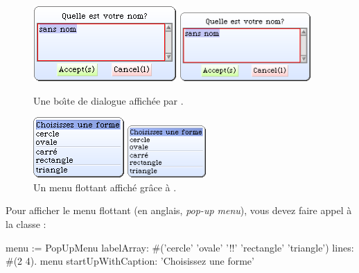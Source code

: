 \documentclass[a4paper,10pt,twoside]{book}
\begin{document}
\begin{figure}[htb]
\begin{minipage}{0.55\textwidth}
	\ifluluelse
		{\centerline{\includegraphics[scale=0.65]{dialog}}}
		{\centerline{\includegraphics[width=5cm]{dialog}}}
	\caption{Une bo\^{\i}te de dialogue affich\'ee par
      .
		\label{fig:dialogName}}
\end{minipage}
\hfill
\begin{minipage}{0.38\textwidth}
	\vfill
	\ifluluelse
		{\centerline{\includegraphics [scale=0.65]{popup}}}
		{\centerline{\includegraphics[width=3cm]{popup}}}
	\vfill
	\vspace{4ex}
	\caption{Un menu flottant affich\'e gr\^ace \`a .}
\end{minipage}
\end{figure}


Pour afficher le menu flottant (en anglais, \emph{pop-up menu}), vous
devez faire appel \`a la classe :
\begin{code}{}
menu := PopUpMenu
	labelArray: #('cercle' 'ovale' '!!' 'rectangle' 'triangle')
	lines: #(2 4).
menu startUpWithCaption: 'Choisissez une forme'
\end{code}
\end{document}
